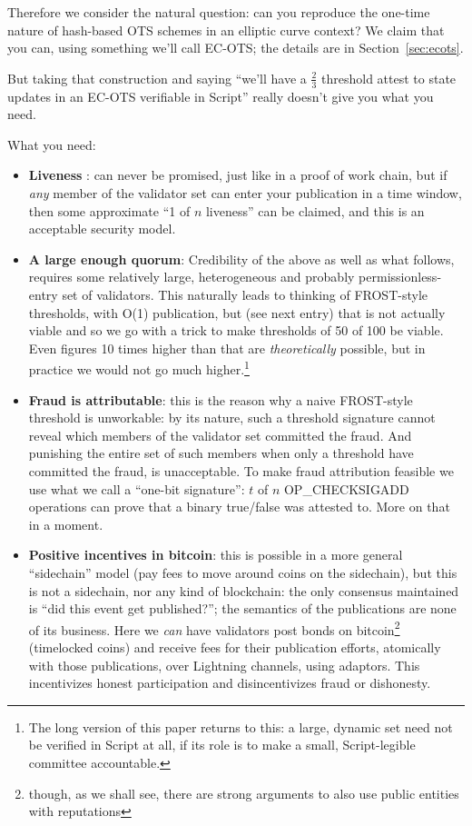 \documentclass[11pt]{article}
\begin{document}
Therefore we consider the natural question: can you reproduce the one-time nature of hash-based OTS schemes in an elliptic curve context? We claim that you can, using something we'll call EC-OTS; the details are in Section~\ref{sec:ecots}.

But taking that construction and saying ``we'll have a $\frac{2}{3}$ threshold attest to state updates in an EC-OTS verifiable in Script'' really doesn't give you what you need.

What you need:

\begin{itemize}
\item \textbf{Liveness} : can never be promised, just like in a proof of work chain, but if \emph{any} member of the validator set can enter your publication in a time window, then some approximate ``1 of $n$ liveness'' can be claimed, and this is an acceptable security model.
\item \textbf{A large enough quorum}: Credibility of the above as well as what follows, requires some relatively large, heterogeneous and probably permissionless-entry set of validators. This naturally leads to thinking of FROST-style thresholds, with O(1) publication, but (see next entry) that is not actually viable and so we go with a trick to make thresholds of 50 of 100 be viable. Even figures 10 times higher than that are \emph{theoretically} possible, but in practice we would not go much higher.\footnote{The long version of this paper returns to this: a large, dynamic set need not be verified in Script at all, if its role is to make a small, Script-legible committee accountable.}
\item \textbf{Fraud is attributable}: this is the reason why a naive FROST-style threshold is unworkable: by its nature, such a threshold signature cannot reveal which members of the validator set committed the fraud. And punishing the entire set of such members when only a threshold have committed the fraud, is unacceptable. To make fraud attribution feasible we use what we call a ``one-bit signature'':  $t$ of $n$ OP\_CHECKSIGADD operations can prove that a binary true/false was attested to. More on that in a moment.
\item \textbf{Positive incentives in bitcoin}: this is possible in a more general ``sidechain'' model (pay fees to move around coins on the sidechain), but this is not a sidechain, nor any kind of blockchain: the only consensus maintained is ``did this event get published?''; the semantics of the publications are none of its business. Here we \emph{can} have validators post bonds on bitcoin\footnote{though, as we shall see, there are strong arguments to also use public entities with reputations} (timelocked coins) and receive fees for their publication efforts, atomically with those publications, over Lightning channels, using adaptors. This incentivizes honest participation and disincentivizes fraud or dishonesty.
\end{itemize}
\end{document}
